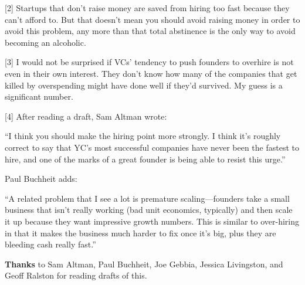{[}2{]} Startups that don't raise money are saved from hiring too fast
because they can't afford to. But that doesn't mean you should avoid
raising money in order to avoid this problem, any more than that total
abstinence is the only way to avoid becoming an alcoholic.

{[}3{]} I would not be surprised if VCs' tendency to push founders to
overhire is not even in their own interest. They don't know how many of
the companies that get killed by overspending might have done well if
they'd survived. My guess is a significant number.

{[}4{]} After reading a draft, Sam Altman wrote:

``I think you should make the hiring point more strongly. I think it's
roughly correct to say that YC's most successful companies have never
been the fastest to hire, and one of the marks of a great founder is
being able to resist this urge.''

Paul Buchheit adds:

``A related problem that I see a lot is premature scaling---founders
take a small business that isn't really working (bad unit economics,
typically) and then scale it up because they want impressive growth
numbers. This is similar to over-hiring in that it makes the business
much harder to fix once it's big, plus they are bleeding cash really
fast.''

\textbf{Thanks} to Sam Altman, Paul Buchheit, Joe Gebbia, Jessica
Livingston, and Geoff Ralston for reading drafts of this.
